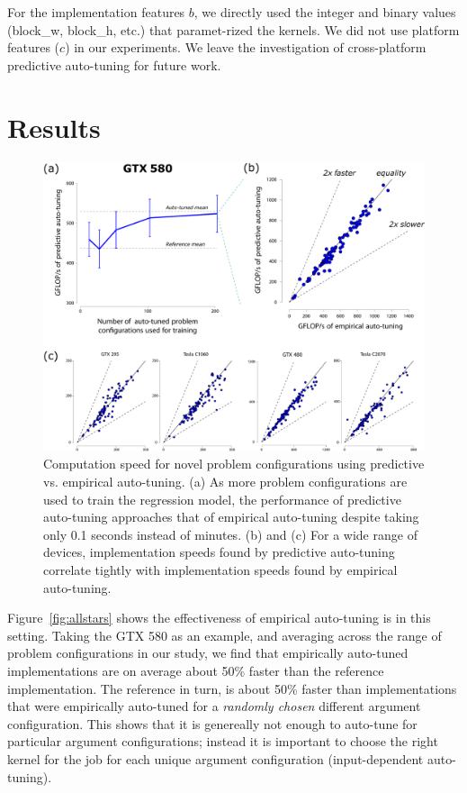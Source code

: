 \documentclass{sig-alternate}
\begin{document}
For the implementation features $b$, we directly used the integer and binary
values (block\_w, block\_h, etc.) that paramet-rized the kernels.  We did not
use platform features ($c$) in our experiments. We leave the investigation of
cross-platform predictive auto-tuning for future work.

\section{Results}

\begin{figure}[!t]
\centering
\includegraphics[width=.9\linewidth]{illustrator/fig_main_R2.pdf}
\caption{
Computation speed for novel problem configurations using predictive
vs. empirical auto-tuning.
(a) As more problem configurations are used to train the regression model,
the performance of predictive auto-tuning approaches that of empirical auto-tuning
despite taking only 0.1 seconds instead of minutes.
(b) and (c) For a wide range of devices, implementation speeds found by predictive auto-tuning correlate tightly with
implementation speeds found by empirical auto-tuning.
}
\label{fig:fig_gflop_scatter}
\end{figure}


Figure~\ref{fig:allstars} shows the effectiveness of empirical auto-tuning is
in this setting.  Taking the GTX 580 as an example, and averaging across the
range of problem configurations in our study, we find that empirically
auto-tuned implementations are on average about 50\% faster than the reference
implementation.  The reference in turn, is about 50\% faster than
implementations that were empirically auto-tuned for a \emph{randomly chosen}
different argument configuration.  This shows that it is genereally not enough
to auto-tune for particular argument configurations; instead it is important to
choose the right kernel for the job for each unique argument configuration
(input-dependent auto-tuning).
\end{document}
